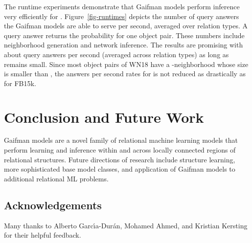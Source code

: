 \documentclass{article}
\begin{document}
The runtime experiments demonstrate that Gaifman models perform inference very efficiently for . Figure~\ref{fig-runtimes} depicts the number of query answers the Gaifman models are able to serve per second, averaged over relation types. A query answer returns the probability for one object pair. These numbers include neighborhood generation and network inference. The results are promising with about  query answers per second (averaged across relation types) as long as  remains  small. Since most object pairs of WN18 have a -neighborhood whose size is smaller than ,  the answers per second rates for  is not reduced as drastically as for FB15k. 

\section{Conclusion and Future Work}

Gaifman models are a novel family of relational machine learning models that perform learning and inference within and across locally connected regions of relational structures. Future directions of research include structure learning, more sophisticated base model classes, and application of Gaifman models to additional relational ML problems. 

\subsection*{Acknowledgements}

Many thanks to Alberto Garc{\'{\i}}a{-}Dur{\'{a}}n, Mohamed Ahmed, and Kristian Kersting for their helpful feedback.

\footnotesize
\end{document}
